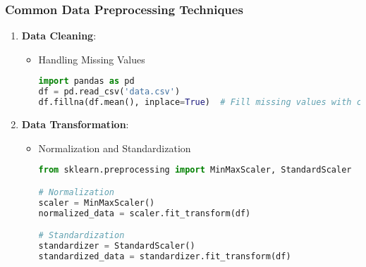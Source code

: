 \documentclass[aspectratio=169]{beamer}
\begin{document}
\begin{frame}[fragile]
    \frametitle{Common Data Preprocessing Techniques}
    \begin{enumerate}
        \item \textbf{Data Cleaning}:
        \begin{itemize}
            \item Handling Missing Values
            \begin{lstlisting}[language=Python]
import pandas as pd
df = pd.read_csv('data.csv')
df.fillna(df.mean(), inplace=True)  # Fill missing values with column mean
            \end{lstlisting}
        \end{itemize}

        \item \textbf{Data Transformation}:
        \begin{itemize}
            \item Normalization and Standardization
            \begin{lstlisting}[language=Python]
from sklearn.preprocessing import MinMaxScaler, StandardScaler

# Normalization
scaler = MinMaxScaler()
normalized_data = scaler.fit_transform(df)

# Standardization
standardizer = StandardScaler()
standardized_data = standardizer.fit_transform(df)
            \end{lstlisting}
        \end{itemize}
    \end{enumerate}
\end{frame}
\end{document}
